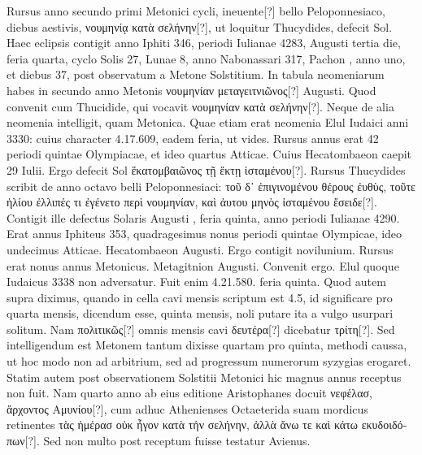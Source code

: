 Rursus anno secundo primi Metonici cycli, ineuente[?]
bello Peloponnesiaco, diebus aestivis,
 \textgreek{νουμηνίᾳ κατὰ σελήνην[?]}, ut loquitur
Thucydides, defecit Sol.
Haec eclipsis contigit anno Iphiti 346, periodi
Iulianae 4283, Augusti tertia die, feria quarta, cyclo Solis 27, Lunae
8, anno Nabonassari 317, Pachon , anno uno, et diebus 37, post
observatum a Metone Solstitium.
In tabula neomeniarum habes
in secundo anno Metonis \textgreek{νουμηνίαν μεταγειτνιῶνος[?]}
  Augusti.
Quod
convenit cum Thucidide, qui vocavit \textgreek{νουμηνίαν κατὰ σελήνην[?]}.
Neque
de alia neomenia intelligit, quam Metonica.
Quae etiam erat neomenia
Elul Iudaici anni 3330: cuius character 4.17.609, eadem feria, ut
vides.
Rursus annus erat 42 periodi quintae Olympiacae, et ideo quartus
Atticae.
Cuius Hecatombaeon caepit 29 Iulii.
Ergo defecit Sol \textgreek{ἕκατομβαιῶνος
τῇ ἕκτῃ ἱσταμένου[?]}.
Rursus Thucydides scribit de anno octavo
belli Peloponnesiaci: \textgreek{τοῦ δ᾽ ἐπιγινομένου θέρους ἐυθὺς,
 τοῦτε ἡλίου ἐλλιπές τι
ἐγένετο περὶ νουμηνίαν, καὶ ἀυτου μηνὸς ἱσταμένου ἔσειδε[?]}.
Contigit ille defectus
Solaris Augusti , feria quinta, anno periodi Iulianae 4290.
Erat
annus Iphiteus 353, quadragesimus nonus periodi quintae Olympicae,
ideo undecimus Atticae.
Hecatombaeon  Augusti.
Ergo  contigit
novilunium.
Rursus erat nonus annus Metonicus.
Metagitnion  Augusti.
Convenit ergo.
Elul quoque Iudaicus 3338 non
adversatur.
Fuit enim 4.21.580. feria quinta.
Quod autem supra
diximus, quando in cella cavi mensis scriptum est 4.5, id significare
pro quarta mensis, dicendum esse, quinta mensis, noli putare ita a vulgo
usurpari solitum.
Nam \textgreek{πολιτικῶς[?]} omnis mensis cavi
 \textgreek{δευτέρα[?]} dicebatur
\textgreek{τρίτη[?]}.
Sed intelligendum est Metonem tantum dixisse quartam
pro quinta, methodi caussa, ut hoc modo non ad arbitrium, sed
ad progressum numerorum syzygias erogaret.
%
Statim autem post observationem
Solstitii Metonici hic magnus annus receptus non fuit.
Nam quarto anno ab eius editione Aristophanes docuit
 \textgreek{νεφέλασ, ἄρχοντος
Αμυνίου[?]},
cum adhuc Athenienses Octaeterida suam mordicus
retinentes \textgreek{τὰς ἡμέρασ οὐκ ἦγον κατὰ τήν σελήνην,
 ἀλλὰ ἄνω τε καὶ κάτω εκυδοιδόπων[?]}.
Sed non multo post receptum fuisse testatur Avienus.
